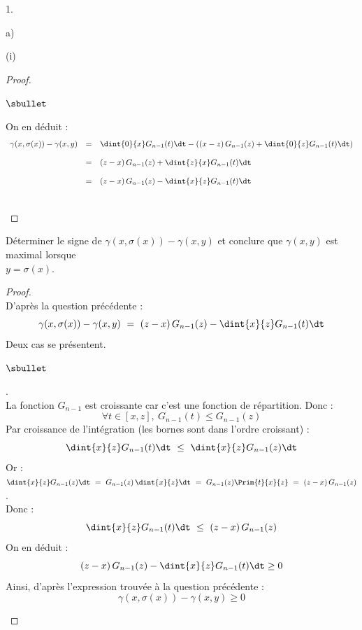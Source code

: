 \documentclass[11pt]{article}%
\begin{document}
\begin{noliste}{1.}
\begin{noliste}{a)}
\begin{nonoliste}{(i)}
\begin{proof}
\begin{noliste}{$\sbullet$}
	  \item On en déduit :
	  \[
	    \begin{array}{rcl}
	      \gamma(x, \sigma(x)) - \gamma(x,y) & = & 
	      \dint{0}{x} G_{n-1}(t) \dt - \left( (x-z) \, G_{n-1}(z)
	      + \dint{0}{z} G_{n-1}(t) \dt\right)
	      \\[.4cm]
	      & = & (z-x) \, G_{n-1}(z) + \dint{z}{x} G_{n-1}(t) \dt
	      \\[.4cm]
	      & = & (z-x) \, G_{n-1}(z) - \dint{x}{z} G_{n-1}(t) \dt
	    \end{array}
	  \]
        \end{noliste}
        ~\\[-1cm]
      \end{proof}
      
      
      \newpage

      
      \item Déterminer le signe de $\gamma(x, \sigma(x)) - 
      \gamma(x,y)$ et conclure que $\gamma(x,y)$ est maximal lorsque\\ 
      $y = \sigma(x)$.
      
      \begin{proof}~\\
      D'après la question précédente :
      \[
        \gamma(x, \sigma(x)) - \gamma(x,y) \ = \
        (z-x) \, G_{n-1}(z) - \dint{x}{z} G_{n-1}(t) \dt
      \]
      Deux cas se présentent.
        \begin{noliste}{$\sbullet$}
	  \item {}.\\
	  La fonction $G_{n-1}$ est croissante car c'est une fonction
	  de répartition. Donc :
	  \[
	    \forall t \in [x,z], \ G_{n-1}(t) \leq G_{n-1}(z)
	  \]
	  Par croissance de l'intégration (les bornes sont 
	  dans l'ordre croissant) :
	  \[
	    \dint{x}{z} G_{n-1}(t) \dt \ \leq \ 
	    \dint{x}{z} G_{n-1}(z) \dt
	  \]
	  Or : $\dint{x}{z} G_{n-1}(z) \dt \ = \ G_{n-1}(z) \,
	  \dint{x}{z} \dt \ = \ G_{n-1}(z) \Prim{t}{x}{z} \ = \
	  (z-x) \, G_{n-1}(z)$.\\[.1cm]
	  Donc : 
	  \[
	    \dint{x}{z} G_{n-1}(t) \dt \ \leq \ (z-x) \, G_{n-1}(z)
	  \]
	  On en déduit :
	  \[
	    (z-x) \, G_{n-1}(z) - \dint{x}{z} G_{n-1}(t) \dt \geq 0
	  \]
	  Ainsi, d'après l'expression trouvée à la question 
	  précédente :
	  \[
	    \gamma(x, \sigma(x)) - \gamma(x,y) \geq 0
	  \]
	  

\end{noliste}
\end{proof}
\end{nonoliste}
\end{noliste}
\end{noliste}
\end{document}
